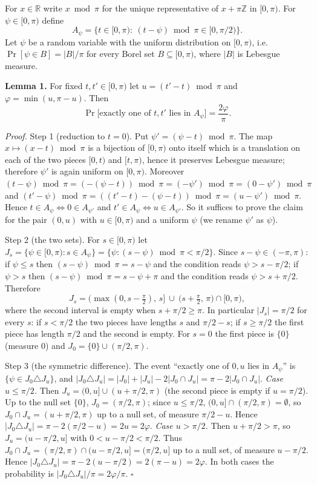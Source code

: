 For \(x\in\mathbb R\) write \(x\bmod\pi\) for the unique representative
of \(x+\pi\mathbb Z\) in \([0,\pi)\). For \(\psi\in[0,\pi)\) define
\[A_\psi=\{t\in[0,\pi):\ (t-\psi)\bmod\pi\in[0,\pi/2)\}.\] Let \(\psi\)
be a random variable with the uniform distribution on \([0,\pi)\),
i.e.~\(\Pr[\psi\in B]=|B|/\pi\) for every Borel set
\(B\subseteq[0,\pi)\), where \(|B|\) is Lebesgue measure.

\textbf{Lemma 1.} For fixed \(t,t'\in[0,\pi)\) let \(u=(t'-t)\bmod\pi\)
and \(\varphi=\min(u,\pi-u)\). Then
\[\Pr\big[\text{exactly one of } t,t' \text{ lies in } A_\psi\big]=\frac{2\varphi}{\pi}.\]

\emph{Proof.} Step 1 (reduction to \(t=0\)). Put
\(\psi'=(\psi-t)\bmod\pi\). The map \(x\mapsto(x-t)\bmod\pi\) is a
bijection of \([0,\pi)\) onto itself which is a translation on each of
the two pieces \([0,t)\) and \([t,\pi)\), hence it preserves Lebesgue
measure; therefore \(\psi'\) is again uniform on \([0,\pi)\). Moreover
\((t-\psi)\bmod\pi=(-(\psi-t))\bmod\pi=(-\psi')\bmod\pi=(0-\psi')\bmod\pi\)
and \((t'-\psi)\bmod\pi=((t'-t)-(\psi-t))\bmod\pi=(u-\psi')\bmod\pi\).
Hence \(t\in A_\psi\iff 0\in A_{\psi'}\) and
\(t'\in A_\psi\iff u\in A_{\psi'}\). So it suffices to prove the claim
for the pair \((0,u)\) with \(u\in[0,\pi)\) and a uniform \(\psi\) (we
rename \(\psi'\) as \(\psi\)).

Step 2 (the two sets). For \(s\in[0,\pi)\) let
\(J_s=\{\psi\in[0,\pi): s\in A_\psi\}=\{\psi: (s-\psi)\bmod\pi<\pi/2\}\).
Since \(s-\psi\in(-\pi,\pi)\): if \(\psi\le s\) then
\((s-\psi)\bmod\pi=s-\psi\) and the condition reads \(\psi>s-\pi/2\); if
\(\psi>s\) then \((s-\psi)\bmod\pi=s-\psi+\pi\) and the condition reads
\(\psi>s+\pi/2\). Therefore
\[J_s=\big(\max(0,s-\tfrac{\pi}{2}),\,s\big]\ \cup\ \big(s+\tfrac{\pi}{2},\,\pi\big)\cap[0,\pi),\]
where the second interval is empty when \(s+\pi/2\ge\pi\). In particular
\(|J_s|=\pi/2\) for every \(s\): if \(s<\pi/2\) the two pieces have
lengths \(s\) and \(\pi/2-s\); if \(s\ge\pi/2\) the first piece has
length \(\pi/2\) and the second is empty. For \(s=0\) the first piece is
\(\{0\}\) (measure \(0\)) and \(J_0=\{0\}\cup(\pi/2,\pi)\).

Step 3 (the symmetric difference). The event ``exactly one of \(0,u\)
lies in \(A_\psi\)'' is \(\{\psi\in J_0\triangle J_u\}\), and
\(|J_0\triangle J_u|=|J_0|+|J_u|-2|J_0\cap J_u|=\pi-2|J_0\cap J_u|\).
\emph{Case \(u\le\pi/2\).} Then \(J_u=(0,u]\cup(u+\pi/2,\pi)\) (the
second piece is empty if \(u=\pi/2\)). Up to the null set \(\{0\}\),
\(J_0=(\pi/2,\pi)\); since \(u\le\pi/2\),
\((0,u]\cap(\pi/2,\pi)=\emptyset\), so \(J_0\cap J_u=(u+\pi/2,\pi)\) up
to a null set, of measure \(\pi/2-u\). Hence
\(|J_0\triangle J_u|=\pi-2(\pi/2-u)=2u=2\varphi\). \emph{Case
\(u>\pi/2\).} Then \(u+\pi/2>\pi\), so \(J_u=(u-\pi/2,u]\) with
\(0<u-\pi/2<\pi/2\). Thus
\(J_0\cap J_u=(\pi/2,\pi)\cap(u-\pi/2,u]=(\pi/2,u]\) up to a null set,
of measure \(u-\pi/2\). Hence
\(|J_0\triangle J_u|=\pi-2(u-\pi/2)=2(\pi-u)=2\varphi\). In both cases
the probability is \(|J_0\triangle J_u|/\pi=2\varphi/\pi\). \(\square\)

